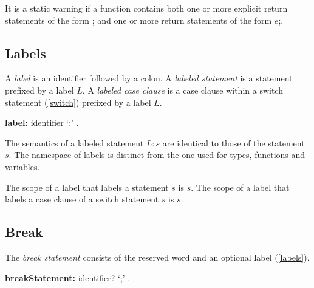 \documentclass{article}
\newcommand{\code}[1]{{\sf #1}}
\begin{document}
\LMHash{}
It is a static warning if a  function contains both one or more explicit return statements of the form \code{\RETURN;} and one or more return statements of the form \code{\RETURN{} $e$;}.




\subsection{ Labels}

\LMHash{}
A {\em label} is an identifier followed by a colon. A {\em labeled statement} is a statement prefixed by a label $L$.  A {\em labeled case clause} is a case clause within a switch statement (\ref{switch}) prefixed by a label $L$.



 \begin{grammar}
{\bf label:}
      identifier `{\escapegrammar :}'
    .
 \end{grammar}
 
\LMHash{}
 The semantics of a labeled statement $L: s$ are identical to those of the statement $s$. The namespace of labels is distinct from the one used for types, functions and variables.

\LMHash{}
The scope of a label that labels a statement $s$ is $s$. The scope of a label that labels a case clause of a switch statement $s$ is $s$.


 
\subsection{ Break}

\LMHash{}
The {\em break statement} consists of the reserved word \BREAK{} and an optional label (\ref{labels}). 

\begin{grammar}
{\bf breakStatement:}
     \BREAK{} identifier? `{\escapegrammar ;}'
    .
 \end{grammar}
 
\end{document}
